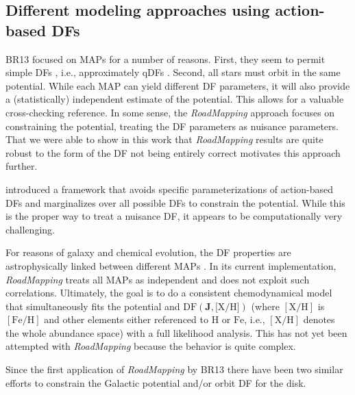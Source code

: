 \documentclass[iop,revtex4,numberedappendix,appendixfloats]{emulateapj}
\newcommand{\vect}[1]{\boldsymbol{#1}}
\newcommand{\MAP}{MAP}
\newcommand{\MAPs}{MAPs}
\newcommand{\RM}{{\sl RoadMapping}}
\begin{document}
\subsection{Different modeling approaches using action-based DFs} 

BR13 focused on \MAPs{} for a number of reasons. First, they seem to permit simple DFs \citep{2012ApJ...751..131B,2012ApJ...755..115B,2012ApJ...753..148B}, i.e., approximately qDFs \citep{2013MNRAS.434..652T}. Second, all stars must orbit in the same potential. While each \MAP{} can yield different DF parameters, it will also provide a (statistically) independent estimate of the potential. This allows for a valuable cross-checking reference. In some sense, the \RM{} approach focuses on constraining the potential, treating the DF parameters as nuisance parameters. That we were able to show in this work that \RM{} results are quite robust to the form of the DF not being entirely correct motivates this approach further. 

\citet{2014MNRAS.437.2230M} introduced a framework that avoids specific parameterizations of action-based DFs and marginalizes over all possible DFs to constrain the potential. While this is the proper way to treat a nuisance DF, it appears to be computationally very challenging.

For reasons of galaxy and chemical evolution, the DF properties are astrophysically linked between different \MAPs{} \citep{2015MNRAS.449.3479S}. In its current implementation, \RM{} treats all \MAPs{} as independent and does not exploit such correlations. Ultimately, the goal is to do a consistent chemodynamical model that simultaneously fits the potential and $\text{DF}(\vect{J},\text{[X/H]})$ (where $[\mathrm{X}/\mathrm{H}]$ is $[\mathrm{Fe}/\mathrm{H}]$ and other elements either referenced to $\mathrm{H}$ or $\mathrm{Fe}$, i.e., $[\mathrm{X}/\mathrm{H}]$ denotes the whole abundance space) with a full likelihood analysis. This has not yet been attempted with \RM{} because the behavior is quite complex. 

Since the first application of \RM{} by BR13 there have been two similar efforts to constrain the Galactic potential and/or orbit DF for the disk.
\end{document}
